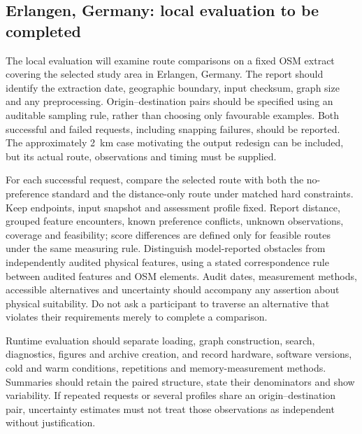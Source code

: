 \subsection{Erlangen, Germany: local evaluation to be completed}
\label{sec:erlangen}

The local evaluation will examine route comparisons on a fixed OSM extract
covering the selected study area in Erlangen, Germany. The report should
identify the extraction date, geographic boundary, input checksum, graph size
and any preprocessing. Origin--destination pairs should be specified using
an auditable sampling rule, rather than choosing only favourable examples.
Both successful and failed requests, including snapping failures, should be
reported. The approximately 2~km case motivating the output redesign can be
included, but its actual route, observations and timing must be supplied.

For each successful request, compare the selected route with both the
no-preference standard and the distance-only route under matched hard
constraints. Keep endpoints, input snapshot and assessment profile fixed.
Report distance, grouped feature encounters, known preference conflicts,
unknown observations, coverage and feasibility; score differences are defined
only for feasible routes under the same measuring rule. Distinguish
model-reported obstacles from independently audited physical features, using
a stated correspondence rule between audited features and OSM elements.
Audit dates, measurement methods, accessible alternatives and uncertainty
should accompany any assertion about physical suitability. Do not ask a
participant to traverse an alternative that violates their requirements merely
to complete a comparison.

Runtime evaluation should separate loading, graph construction, search,
diagnostics, figures and archive creation, and record hardware, software
versions, cold and warm conditions, repetitions and memory-measurement methods.
Summaries should retain the paired structure, state their denominators and
show variability. If repeated requests or several profiles share an
origin--destination pair, uncertainty estimates must not treat those
observations as independent without justification.

